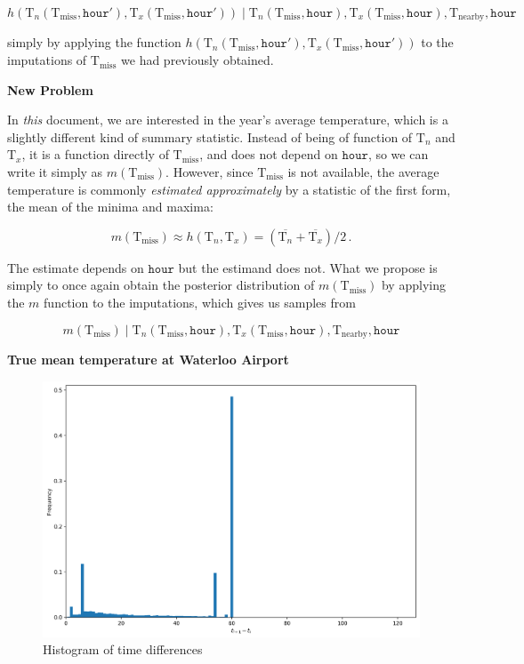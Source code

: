 \documentclass[letter]{article}
\makeatletter
\def\maxwidth{\ifdim\Gin@nat@width>\linewidth\linewidth
\else\Gin@nat@width\fi}
\let\Oldincludegraphics\includegraphics
\renewcommand{\includegraphics}[1]{\Oldincludegraphics[width=0.98\maxwidth]{#1}}
\newcommand{\genericdel}[3]{%
      \left#1#3\right#2
    }
\newcommand{\del}[1]{\genericdel(){#1}}
\newcommand{\T}{\mathrm{T}}
\newcommand{\Tn}{\T_{n}}
\newcommand{\Tx}{\T_{x}}
\newcommand{\miss}{\mathrm{miss}}
\newcommand{\obs}{\mathrm{nearby}}
\newcommand{\hour}{\mathtt{hour}}
\newcommand{\mean}{m}
\makeatother
\begin{document}
\begin{equation}
    h\del{\Tn\del{\T_\miss, \hour'}, \Tx\del{\T_\miss, \hour'}}
    \mid
    \Tn\del{\T_\miss, \hour}, \Tx\del{\T_\miss, \hour}, \T_\obs, \hour
\end{equation}

simply by applying the function \(h\del{\Tn\del{\T_\miss, \hour'}, \Tx\del{\T_\miss, \hour'}}\)
to the imputations of \(\T_\miss\) we had previously obtained.
    


        \textbf{New Problem}

In \emph{this} document, we are interested in the year's average temperature, which is a slightly different kind of summary statistic.
Instead of being of function of \(\Tn\) and \(\Tx\), it is a function directly of \(\T_\miss\), and does not depend on \(\hour\), so we can write it simply as \(\mean\del{\T_\miss}\).
However, since \(\T_\miss\) is not available, the average temperature is commonly \emph{estimated approximately} by a statistic of the first form, the mean of the minima and maxima:

\begin{equation}
    \mean\del{\T_\miss} \approx h\del{\Tn, \Tx} = \del{\overline{\Tn} + \overline{\Tx}} \big/ 2\,.
\end{equation}

The estimate depends on \(\hour\) but the estimand does not.
What we propose is simply to once again obtain the posterior distribution of \(\mean\del{\T_\miss}\) by applying the \(\mean\) function to the imputations, which gives us samples from

\begin{equation}
    \mean\del{\T_\miss}
    \mid
    \Tn\del{\T_\miss, \hour}, \Tx\del{\T_\miss, \hour}, \T_\obs, \hour
\end{equation}
    


        \textbf{True mean temperature at Waterloo Airport}
    


        \begin{figure}
\centering
\includegraphics{../figures/histogram_time_diff.png}
\caption{\label{fig:histogram_time_diff}Histogram of time differences}
\end{figure}
    
\end{document}
